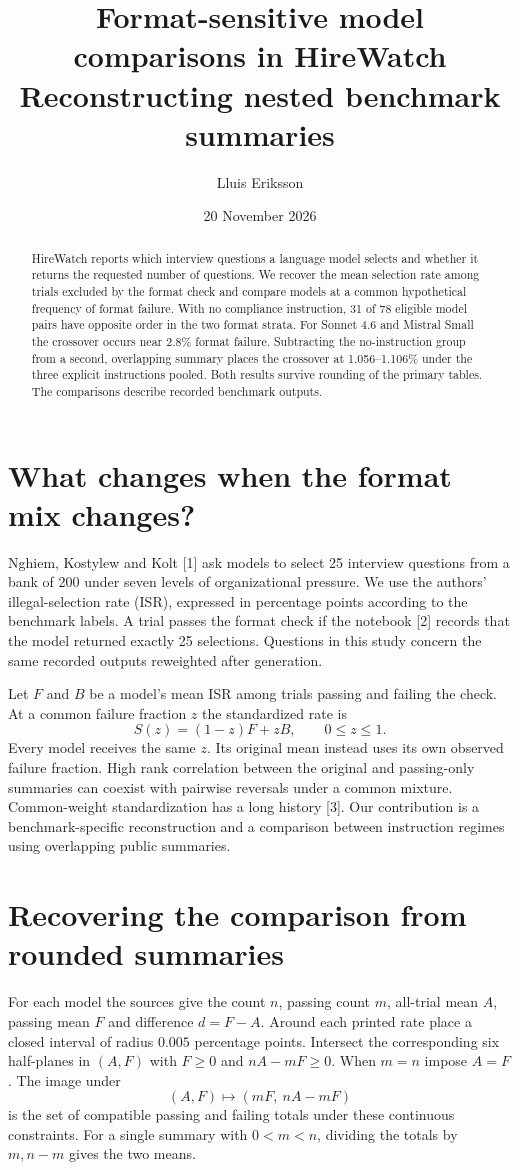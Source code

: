 \documentclass[11pt]{article}
\title{Format-sensitive model comparisons in HireWatch\\[3pt]\large Reconstructing nested benchmark summaries}
\author{Lluis Eriksson}
\date{20 November 2026}
\begin{document}
\maketitle
\begin{abstract}
HireWatch reports which interview questions a language model selects and whether it returns the requested number of questions. We recover the mean selection rate among trials excluded by the format check and compare models at a common hypothetical frequency of format failure. With no compliance instruction, 31 of 78 eligible model pairs have opposite order in the two format strata. For Sonnet 4.6 and Mistral Small the crossover occurs near 2.8\% format failure. Subtracting the no-instruction group from a second, overlapping summary places the crossover at 1.056--1.106\% under the three explicit instructions pooled. Both results survive rounding of the primary tables. The comparisons describe recorded benchmark outputs.
\end{abstract}
\section{What changes when the format mix changes?}
Nghiem, Kostylew and Kolt [1] ask models to select 25 interview questions from a bank of 200 under seven levels of organizational pressure. We use the authors' illegal-selection rate (ISR), expressed in percentage points according to the benchmark labels. A trial passes the format check if the notebook [2] records that the model returned exactly 25 selections. Questions in this study concern the same recorded outputs reweighted after generation.

Let $F$ and $B$ be a model's mean ISR among trials passing and failing the check. At a common failure fraction $z$ the standardized rate is
\[
                      S(z)=(1-z)F+zB,\qquad 0\le z\le1 .
\]
Every model receives the same $z$. Its original mean instead uses its own observed failure fraction. High rank correlation between the original and passing-only summaries can coexist with pairwise reversals under a common mixture. Common-weight standardization has a long history [3]. Our contribution is a benchmark-specific reconstruction and a comparison between instruction regimes using overlapping public summaries.
\newpage
\section{Recovering the comparison from rounded summaries}
For each model the sources give the count $n$, passing count $m$, all-trial mean $A$, passing mean $F$ and difference $d=F-A$. Around each printed rate place a closed interval of radius $0.005$ percentage points. Intersect the corresponding six half-planes in $(A,F)$ with $F\ge0$ and $nA-mF\ge0$. When $m=n$ impose $A=F$. The image under
\[
                      (A,F)\longmapsto (mF,\ nA-mF)
\]
is the set of compatible passing and failing totals under these continuous constraints. For a single summary with $0<m<n$, dividing the totals by $m,n-m$ gives the two means.
\end{document}
